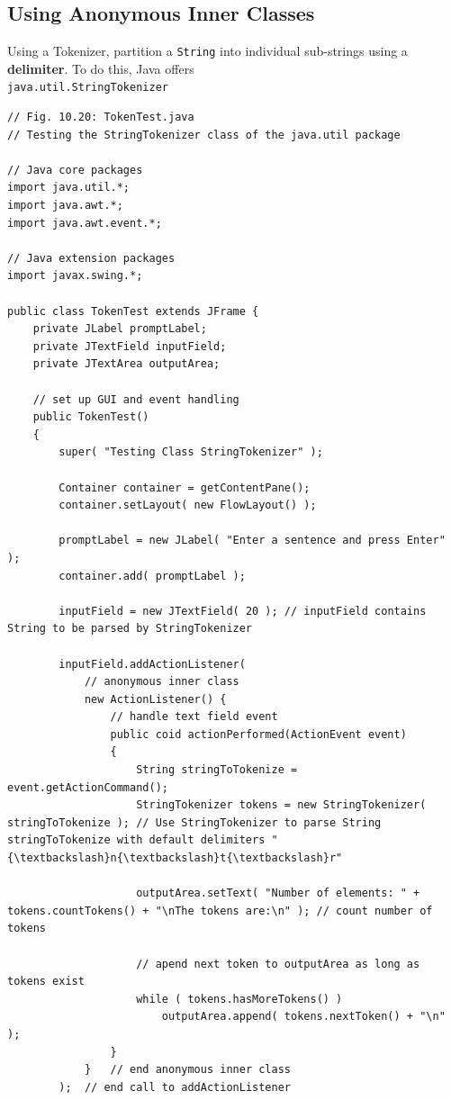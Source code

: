\documentclass[a4paper,11pt]{article}
\newenvironment{code}{\captionsetup{type=listing}}{}
\begin{document}
\subsection{Using Anonymous Inner Classes}
Using a Tokenizer, partition a \verb|String| into individual sub-strings using a \textbf{delimiter}. 
To do this, Java offers \\ \verb|java.util.StringTokenizer|

\begin{code}
\begin{verbatim}
// Fig. 10.20: TokenTest.java
// Testing the StringTokenizer class of the java.util package

// Java core packages
import java.util.*;
import java.awt.*;
import java.awt.event.*;

// Java extension packages
import javax.swing.*;

public class TokenTest extends JFrame {
    private JLabel promptLabel;
    private JTextField inputField;
    private JTextArea outputArea;

    // set up GUI and event handling
    public TokenTest()
    {
        super( "Testing Class StringTokenizer" );

        Container container = getContentPane();
        container.setLayout( new FlowLayout() );

        promptLabel = new JLabel( "Enter a sentence and press Enter" );
        container.add( promptLabel );

        inputField = new JTextField( 20 ); // inputField contains String to be parsed by StringTokenizer

        inputField.addActionListener(
            // anonymous inner class
            new ActionListener() {
                // handle text field event 
                public coid actionPerformed(ActionEvent event) 
                {
                    String stringToTokenize = event.getActionCommand();
                    StringTokenizer tokens = new StringTokenizer( stringToTokenize ); // Use StringTokenizer to parse String stringToTokenize with default delimiters "{\textbackslash}n{\textbackslash}t{\textbackslash}r"

                    outputArea.setText( "Number of elements: " + tokens.countTokens() + "\nThe tokens are:\n" ); // count number of tokens

                    // apend next token to outputArea as long as tokens exist
                    while ( tokens.hasMoreTokens() )
                        outputArea.append( tokens.nextToken() + "\n" );
                } 
            }   // end anonymous inner class
        );  // end call to addActionListener


\end{verbatim}
\end{code}
\end{document}
